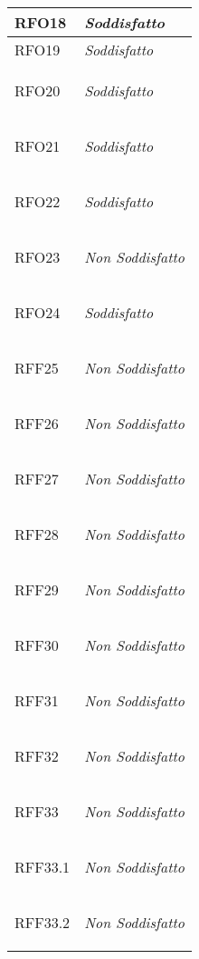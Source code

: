 \begin{longtable}{|>{\centering}m{5cm}|m{5cm}<{\centering}|}
    \hypertarget{RFO18}{RFO18} & \textit{Soddisfatto}\\ \hline
   
    \hypertarget{RFO19}{RFO19} & \textit{Soddisfatto}\\ \hline
   
    \hypertarget{RFO20}{RFO20} & \textit{Soddisfatto}\\ \hline
   
    \hypertarget{RFO21}{RFO21} & \textit{Soddisfatto}\\ \hline
   
    \hypertarget{RFO22}{RFO22} & \textit{Soddisfatto}\\ \hline
   
    \hypertarget{RFO23}{RFO23} & \textit{Non Soddisfatto}\\ \hline
   
    \hypertarget{RFO24}{RFO24} & \textit{Soddisfatto}\\ \hline
   
    \hypertarget{RFF25}{RFF25} & \textit{Non Soddisfatto}\\ \hline
   
    \hypertarget{RFF26}{RFF26} & \textit{Non Soddisfatto}\\ \hline
   
    \hypertarget{RFF27}{RFF27} & \textit{Non Soddisfatto}\\ \hline
   
    \hypertarget{RFF28}{RFF28} & \textit{Non Soddisfatto}\\ \hline
   
    \hypertarget{RFF29}{RFF29} & \textit{Non Soddisfatto}\\ \hline
   
    \hypertarget{RFF30}{RFF30} & \textit{Non Soddisfatto}\\ \hline
   
    \hypertarget{RFF31}{RFF31} & \textit{Non Soddisfatto}\\ \hline
   
    \hypertarget{RFF32}{RFF32} & \textit{Non Soddisfatto}\\ \hline
   
    \hypertarget{RFF33}{RFF33} & \textit{Non Soddisfatto}\\ \hline
   
    \hypertarget{RFF33.1}{RFF33.1} & \textit{Non Soddisfatto}\\ \hline
   
    \hypertarget{RFF33.2}{RFF33.2} & \textit{Non Soddisfatto}\\ \hline
   

\end{longtable}
